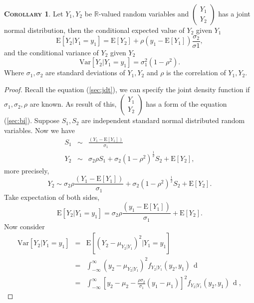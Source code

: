 \documentclass[a4paper, twoside, 11pt]{article}
\theoremstyle{definition}
\newtheorem{corollary}[definition]{\scshape Corollary}
\newcommand{\sqbr}[1]{\left[ {#1} \right]}
\begin{document}
\begin{corollary}
  Let $Y_1, Y_2$ be $\mathbb{R}$-valued random variables and $\left(
    \begin{array}{c}
      Y_1 \\
      Y_2
    \end{array}
	\right)$  has a joint normal distribution, then the conditional expected value of $Y_2$ given $Y_1$
    $$
	\mathrm{E}[Y_2| Y_1=y_1] = \mathrm{E}[Y_2] + \rho (y_1 - \mathrm{E}[Y_1])\frac{\sigma_2}{\sigma1},
	$$
	and the conditional variance of $Y_2$ given $Y_2$
	$$
		\mathrm{Var}[Y_2| Y_1 = y_1] = \sigma_1^2 (1 - \rho^2).
	$$
	Where $\sigma_1, \sigma_2$ are standard deviations of $Y_1, Y_2$ and $\rho$ is the correlation of $Y_1, Y_2$.
\end{corollary}

\begin{proof}
  Recall the equation (\ref{sec:jdt}), we can specify the joint density function if $\sigma_1, \sigma_2, \rho$ are known. As result of this,
  $\left(
    \begin{array}{c}
      Y_1 \\
      Y_2
    \end{array}
	\right)$ has a form of the equation (\ref{sec:bi}).
  Suppose $S_1, S_2$ are independent standard normal distributed random variables. Now we have
  \begin{eqnarray*}
	S_1 &\sim& \frac{(Y_1 - \mathrm{E}[Y_1])}{\sigma_1} \\
	Y_2 &\sim& \sigma_2\rho S_1 + \sigma_2(1-\rho^2)^{\frac{1}{2}} S_2 + \mathrm{E}[Y_2],
  \end{eqnarray*}
  more precisely,
  $$
  Y_2 \sim \sigma_2\rho \frac{(Y_1 - \mathrm{E}[Y_1])}{\sigma_1}  + \sigma_2(1-\rho^2)^{\frac{1}{2}} S_2 + \mathrm{E}[Y_2].
  $$
  Take expectation of both sides, 
  \begin{equation*}
	\mathrm{E}[Y_2|Y_1=y_1] = \sigma_2\rho \frac{(y_1 - \mathrm{E}[Y_1])}{\sigma_1} + \mathrm{E}[Y_2].
  \end{equation*}
  Now consider
  \begin{eqnarray*}
	\mathrm{Var}[Y_2|Y_1=y_1] &=&  \mathrm{E}[(Y_2 - \mu_{Y_2|Y_1})^2|Y_1=y_1]\\
							  &=& \int_{-\infty}^{\infty}(y_2 - \mu_{Y_2|Y_1})^2f_{Y_2|Y_1}(y_2, y_1)\,\mathop{dy_2}\\
							  &=& \int_{-\infty}^{\infty}\sqbr{y_2 - \mu_2 - \frac{\rho\sigma_2}{\sigma_1}(y_1-\mu_1)}^2f_{Y_2|Y_1}(y_2, y_1)\,\mathop{dy_2},
  \end{eqnarray*}

\end{proof}
\end{document}
